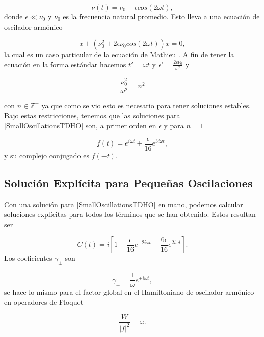 \documentclass[10pt,a4paper]{report}
\begin{document}
\begin{equation}\label{SmallOscillationsTDHO}
\nu(t) = \nu_0 + \epsilon cos(2\omega t),
\end{equation} donde $\epsilon \ll \nu_0$ y $\nu_0$ es la frecuencia natural promedio. Esto lleva a una ecuación de oscilador armónico

\begin{equation}
\ddot{x} + (\nu_0^2 + 2\epsilon \nu_0 cos(2\omega t))x = 0,
\end{equation} la cual es un caso particular de la ecuación de Mathieu \cite{PiatekME}. A fin de tener la ecuación en la forma estándar hacemos $t'= \omega t$ y $\epsilon' = \frac{2\epsilon \nu_0}{\omega^2}$ y


\begin{equation}
\frac{\nu_0^2}{\omega^2} = n^2\label{scattering}
\end{equation}

con $n \in \mathbb{Z}^+$ ya que como se vio esto es necesario para tener soluciones estables\cite{WardFT}. Bajo estas restricciones, tenemos que las soluciones para \eqref{SmallOscillationsTDHO} son, a primer orden en $\epsilon$ y para $n=1$

\begin{equation}\label{SmallOscillationsSolution}
f(t)=  e^{i\omega t} + \frac{\epsilon}{16} e^{3i\omega t},
\end{equation} y su complejo conjugado es $f(-t)$.

\subsection{Solución Explícita para Pequeñas Oscilaciones }

Con una solución para \ref{SmallOscillationsTDHO} en mano, podemos calcular soluciones explícitas para todos los términos que se han obtenido. Estos resultan ser\cite{TesisMaestria}

\begin{equation}
C(t) = i [1 -\frac{\epsilon}{16}e^{-2i\omega t}-\frac{6\epsilon}{16}e^{2i\omega t}].
\end{equation} Los coeficientes $\gamma_{\pm}$ son

\begin{equation}
\gamma_\pm= \frac{1}{\omega}e^{\mp i\omega t},
\end{equation} se hace lo mismo para el factor global en el Hamiltoniano de oscilador armónico en operadores de Floquet

\begin{equation}
\frac{W}{|f|^2} = \omega.
\end{equation} 
\end{document}
